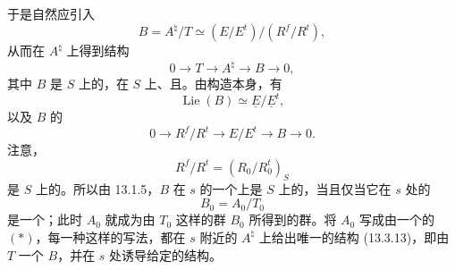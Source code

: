 于是自然应引入
\begin{equation}
 B=A^\natural/T\simeq(E/E^t)/(R^f/R^t),
 \tag{13.3.12}
\end{equation}
从而在 $A^\natural$ 上得到结构
\begin{equation}
 0\longrightarrow T\longrightarrow A^\natural\longrightarrow B\longrightarrow0,
 \tag{13.3.13}
\end{equation}
其中 $B$ 是 $S$ 上的，在 $S$ 上、且。由构造本身，有
\begin{equation}
 \operatorname{Lie}(B)\simeq\underline E/\underline E^t,
 \tag{13.3.14}
\end{equation}
以及 $B$ 的
\begin{equation}
 0\longrightarrow R^f/R^t\longrightarrow E/E^t\longrightarrow B\longrightarrow0.
 \tag{13.3.15}
\end{equation}
注意，
\begin{equation}
 R^f/R^t=(R_0/R_0^t)_S
 \tag{13.3.16}
\end{equation}
是 $S$ 上的。所以由 13.1.5，$B$ 在 $s$ 的一个上是 $S$ 上的，当且仅当它在 $s$ 处的
\[
 B_0=A_0/T_0
\]
是一个；此时 $A_0$ 就成为由 $T_0$ 这样的群 $B_0$ 所得到的群。将 $A_0$ 写成由一个的 $(*)$，每一种这样的写法，都在 $s$ 附近的 $A^\natural$ 上给出唯一的结构 (13.3.13)，即由 $T$ 一个 $B$，并在 $s$ 处诱导给定的结构。

